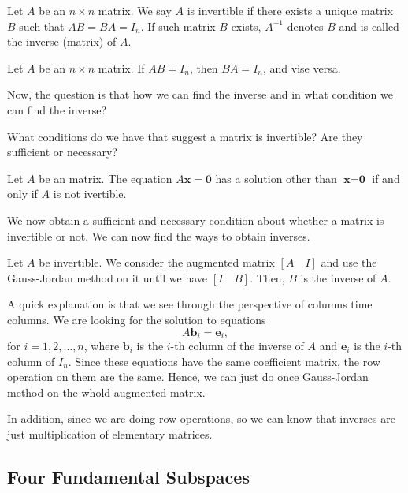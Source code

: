 \documentclass[11pt]{article}
\theoremstyle{break}
\theoremstyle{no_label}
\newcommand{\bfzero}{\textbf{0}}
\newcommand{\bfb}{\textbf{b}}
\newcommand{\bfe}{\textbf{e}}
\newcommand{\bfx}{\textbf{x}}
\numberwithin{equation}{section}
\begin{document}
\begin{definition}
    Let $A$ be an $n\times n$ matrix. We say $A$ is invertible if there exists a unique matrix $B$ such that $AB=BA=I_n$. If such matrix $B$ exists, $A^{-1}$ denotes $B$ and is called the inverse (matrix) of $A$.
\end{definition}

\begin{theorem}
    Let $A$ be an $n\times n$ matrix. If $AB=I_n$, then $BA=I_n$, and vise versa.
\end{theorem}

Now, the question is that how we can find the inverse and in what condition we can find the inverse?

\begin{question}
    What conditions do we have that suggest a matrix is invertible? Are they sufficient or necessary?
\end{question}

\begin{theorem}
    Let $A$ be an matrix. The equation $A\bfx=\bfzero$ has a solution other than $\bfx=\bfzero$ if and only if $A$ is not ivertible.
\end{theorem}

We now obtain a sufficient and necessary condition about whether a matrix is invertible or not. We can now find the ways to obtain inverses.

\begin{theorem}
    Let $A$ be invertible. We consider the augmented matrix $[A\quad I]$ and use the Gauss-Jordan method on it until we have $[I\quad B]$. Then, $B$ is the inverse of $A$.
\end{theorem}
A quick explanation is that we see through the perspective of columns time columns. We are looking for the solution to equations 
\begin{equation*}
    A\bfb_i=\bfe_i,
\end{equation*}
for $i=1,2,\dots,n$, where $\bfb_i$ is the $i$-th column of the inverse of $A$ and $\bfe_i$ is the $i$-th column of $I_n$. Since these equations have the same coefficient matrix, the row operation on them are the same. Hence, we can just do once Gauss-Jordan method on the whold augmented matrix.

In addition, since we are doing row operations, so we can know that inverses are just multiplication of elementary matrices.

\subsection{Four Fundamental Subspaces}
\end{document}
